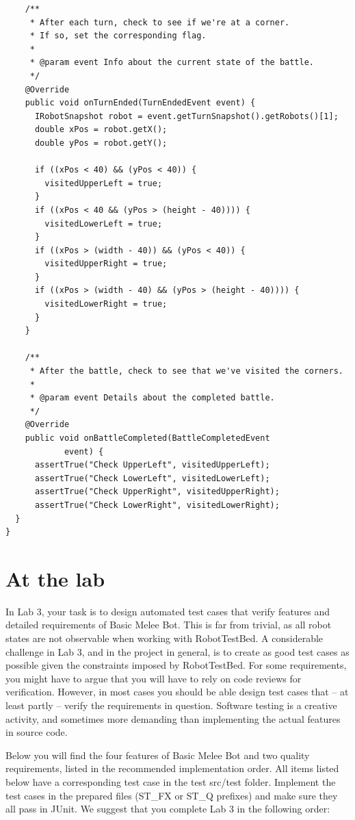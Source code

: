 \documentclass{scrreprt}
\begin{document}
\begin{verbatim}
	/**
	 * After each turn, check to see if we're at a corner.
	 * If so, set the corresponding flag.
	 *
	 * @param event Info about the current state of the battle.
	 */
	@Override
	public void onTurnEnded(TurnEndedEvent event) {
      IRobotSnapshot robot = event.getTurnSnapshot().getRobots()[1];
      double xPos = robot.getX();
      double yPos = robot.getY();

      if ((xPos < 40) && (yPos < 40)) {
        visitedUpperLeft = true;
      }
      if ((xPos < 40 && (yPos > (height - 40)))) {
        visitedLowerLeft = true;
      }
      if ((xPos > (width - 40)) && (yPos < 40)) {
        visitedUpperRight = true;
      }
      if ((xPos > (width - 40) && (yPos > (height - 40)))) {
        visitedLowerRight = true;
      }
	}

	/**
	 * After the battle, check to see that we've visited the corners.
	 *
	 * @param event Details about the completed battle.
	 */
	@Override
	public void onBattleCompleted(BattleCompletedEvent
			event) {
      assertTrue("Check UpperLeft", visitedUpperLeft);
      assertTrue("Check LowerLeft", visitedLowerLeft);
      assertTrue("Check UpperRight", visitedUpperRight);
      assertTrue("Check LowerRight", visitedLowerRight);
  }
}
\end{verbatim}

\chapter{At the lab} \label{sec:atlab}
In Lab 3, your task is to design automated test cases that verify features and detailed requirements of Basic Melee Bot. This is far from trivial, as all robot states are not observable when working with RobotTestBed. A considerable challenge in Lab 3, and in the project in general, is to create as good test cases as possible given the constraints imposed by RobotTestBed. For some requirements, you might have  to argue that you will have to rely on code reviews for verification. However, in most cases you should be able design test cases that -- at least partly -- verify the requirements in question. Software testing is a creative activity, and sometimes more demanding than implementing the actual features in source code.

Below you will find the four features of Basic Melee Bot and two quality requirements, listed in the recommended implementation order. All items listed below have a corresponding test case in the test src/test folder. Implement the test cases in the prepared files (ST_FX or ST_Q prefixes) and make sure they all pass in JUnit. We suggest that you complete Lab 3 in the following order:
\end{document}
